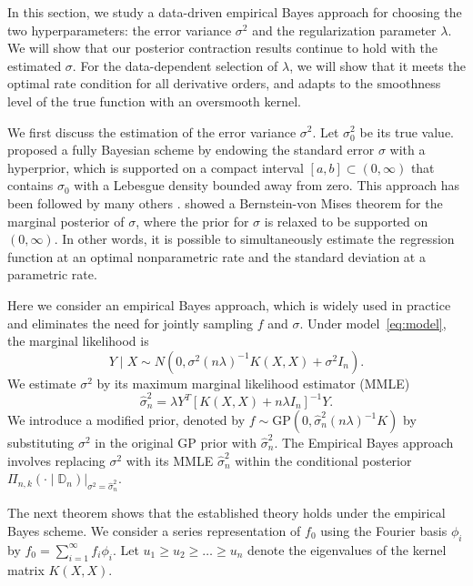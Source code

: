 \documentclass[12pt]{article}
\newcommand\data{\mathbb{D}_n}
\newcommand{\s}{\sum_{i=1}^{\infty}}
\newcommand{\GP}{\mathrm{GP}}
\theoremstyle{plain}
\theoremstyle{nonitalicremark}
\begin{document}
In this section, we study a data-driven empirical Bayes approach for choosing the two hyperparameters: the error variance $\sigma^2$ and the regularization parameter $\lambda$. We will show that our posterior contraction results continue to hold with the estimated $\sigma$. For the data-dependent selection of $\lambda$, we will show that it meets the optimal rate condition for all derivative orders, and adapts to the smoothness level of the true function with an oversmooth kernel.

We first discuss the estimation of the error variance $\sigma^2$. Let $\sigma^2_0$ be its true value. \cite{van2009adaptive} proposed a fully Bayesian scheme by endowing the standard error $\sigma$ with a hyperprior, which is supported on a compact interval $[a,b]\subset (0,\infty)$ that contains $\sigma_0$ with a Lebesgue density bounded away from zero. This approach has been followed by many others \citep{bhattacharya2014anisotropic,li2020comparing}. \cite{de2013semiparametric} showed a Bernstein-von Mises theorem for the marginal posterior of $\sigma$, where the prior for $\sigma$ is relaxed to be supported on $(0,\infty)$. In other words, it is possible to simultaneously estimate the regression function at an optimal nonparametric rate and the standard deviation at a parametric rate.

Here we consider an empirical Bayes approach, which is widely used in practice and eliminates the need for jointly sampling $f$ and $\sigma$. Under model~\eqref{eq:model}, the marginal likelihood is
\begin{equation}\label{eq:marginal}
Y\mid X\sim N(0, \sigma^2(n\lambda)^{-1}K(X,X)+\sigma^2I_n).
\end{equation}
We estimate $\sigma^2$ by its maximum marginal likelihood estimator (MMLE)
\begin{equation}\label{eq:EB.sigma}
\hat{\sigma}^2_n=\lambda Y^T[K(X,X)+n\lambda I_n]^{-1}Y.
\end{equation}
We introduce a modified prior, denoted by $f \sim \GP(0, \hat{\sigma}^2_n (n \lambda)^{-1} K)$ by substituting $\sigma^2$ in the original GP prior with $\hat{\sigma}^2_n$. The Empirical Bayes approach involves replacing $\sigma^2$ with its MMLE $\hat\sigma^2_n$ within the conditional posterior $\Pi_{n,k} (\cdot\mid\data)|_{\sigma^2 = \hat \sigma^2_n}$.

The next theorem shows that the established theory holds under the empirical Bayes scheme. We consider a series representation of $f_0$ using the Fourier basis $\phi_i$ by $f_0 = \s f_i\phi_i$. Let $u_1\geq u_2\geq \ldots\geq u_n$ denote the eigenvalues of the kernel matrix $K(X,X)$.
\end{document}
